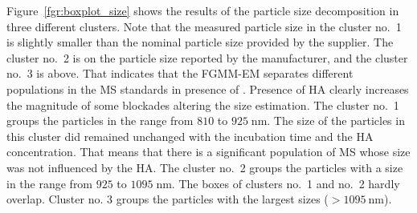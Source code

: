 \documentclass[journal=langd5,manuscript=article]{achemso}
\begin{document}

Figure~\ref{fgr:boxplot_size} shows the results of the particle size decomposition in three different clusters. Note that the measured particle size in the cluster no.~1 is slightly smaller than the nominal particle size provided by the supplier. 
The cluster no.~2 is on the particle size reported by the manufacturer, and the cluster no.~3 is above. That indicates that the FGMM-EM separates different populations in the MS standards in presence of . Presence of HA clearly increases the  magnitude of some blockades altering the size estimation.
The cluster no.~1 groups the particles in the range from $810$ to $925\;\mathrm{nm}$. The size of the particles in this cluster did remained unchanged with the incubation time and the HA concentration. That means that there is a significant population of MS whose size was not influenced by the HA.
The cluster no.~2 groups the particles with a size in the range from $925$ to $1095\;\mathrm{nm}$. The boxes of clusters no.~1 and no.~2 hardly overlap. 
Cluster no. 3 groups the particles with the largest sizes ($> 1095~\mathrm{nm}$). 
\end{document}
